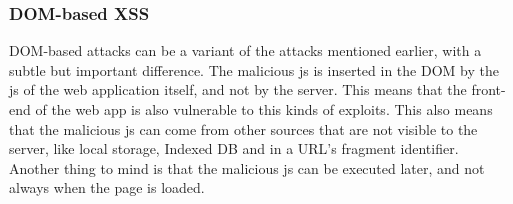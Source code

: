 \subsubsection{DOM-based XSS}
DOM-based attacks can be a variant of the attacks mentioned earlier, with a subtle but important difference. The malicious js is inserted in the DOM by the js of the web application itself, and not by the server. This means that the front-end of the web app is also vulnerable to this kinds of exploits. This also means that the malicious js can come from other sources that are not visible to the server, like local storage, Indexed DB and in a URL's fragment identifier. Another thing to mind is that the malicious js can be executed later, and not always when the page is loaded.	

